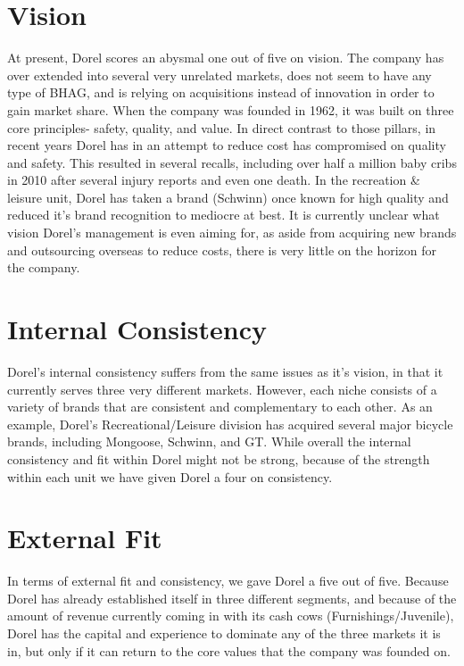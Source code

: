 \section{Vision}
At present, Dorel scores an abysmal one out of five on vision.  The company has over extended into several very unrelated markets, does not seem to have any type of BHAG, and is relying on acquisitions instead of innovation in order to gain market share.  When the company was founded in 1962, it was built on three core principles- safety, quality, and value.  In direct contrast to those pillars, in recent years Dorel has in an attempt to reduce cost has compromised on quality and safety. This resulted in several recalls, including over half a million baby cribs in 2010 after several injury reports and even one death.  In the recreation \& leisure unit, Dorel has taken a brand (Schwinn) once known for high quality and reduced it’s brand recognition to mediocre at best.  It is currently unclear what vision Dorel’s management is even aiming for, as aside from acquiring new brands and outsourcing overseas to reduce costs, there is very little on the horizon for the company.  

\section{Internal Consistency}
Dorel’s internal consistency suffers from the same issues as it’s vision, in that it currently serves three very different markets.  However, each niche consists of a variety of brands that are consistent and complementary to each other.  As an example, Dorel’s Recreational/Leisure division has acquired several major bicycle brands, including Mongoose, Schwinn, and GT.  While overall the internal consistency and fit within Dorel might not be strong, because of the strength within each unit we have given Dorel a four on consistency.

\section{External Fit}
In terms of external fit and consistency, we gave Dorel a five out of five.  Because Dorel has already established itself in three different segments, and because of the amount of revenue currently coming in with its cash cows (Furnishings/Juvenile), Dorel has the capital and experience to dominate any of the three markets it is in, but only if it can return to the core values that the company was founded on.

